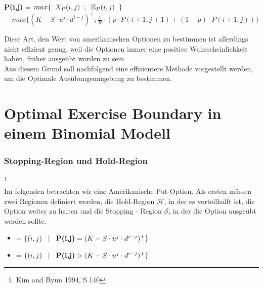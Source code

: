 \documentclass[12pt,a4paper]{article}
\begin{document}
\begin{text}
\begin{center}
    \textbf{P(i,j)} = $max \{\hspace{0,2 cm} X_P(i,j) \hspace{0,2 cm};\hspace{0,2 cm}\mathbb{E}_P(i,j) \hspace{0,2 cm}\}$
    \\[0.3 cm] 
    = $max \{(K - S \cdot u^j \cdot d^{i-j})^+; \frac{1}{R} \cdot (p\cdot P(i+1,j+1) + (1-p)\cdot P(i+1,j)) \}$  
\end{center}
\raggedlift
Diese Art, den Wert von amerikanischen Optionen zu bestimmen ist allerdings nicht effizient genug, weil die Optionen immer eine positive Wahrscheinlichkeit haben, früher ausgeübt worden zu sein.
\\
Aus diesem Grund soll nachfolgend eine effizientere Methode vorgestellt werden, um die Optimale Ausübungsumgebung zu bestimmen.

\newpage
\part{\centering Optimal Exercise Boundary in einem Binomial Modell}   
\section{Stopping-Region und Hold-Region}\footnote[1]{Kim and Byun 1994, S.140}\\
Im folgenden betrachten wir eine Amerikanische Put-Option.
Als ersten müssen zwei Regionen definiert werden, die Hold-Region $\mathcal{H}$, in der es vorteilhalft ist, die Option weiter zu halten und die Stopping - Region $\mathcal{S}$, in der die Option ausgeübt werden sollte.\\
\begin{itemize}
    \item {} = $ \{ (i,j) \hspace{0,3 cm} \vert \hspace{0,3 cm} \textbf{P(i,j)} = (K - S \cdot u^j \cdot d^{i-j})^+ \}$
    \item {} = $ \{ (i,j) \hspace{0,3 cm} \vert \hspace{0,3 cm} \textbf{P(i,j)} > (K - S \cdot u^j \cdot d^{i-j})^+ \}$
\end{itemize}


\end{text}
\end{document}
